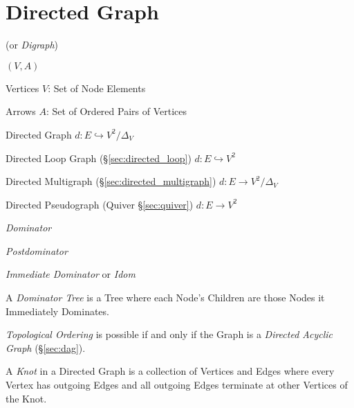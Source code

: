 \section{Directed Graph}\label{sec:directed_graph}

(or \emph{Digraph})

$(V,A)$

Vertices $V$: Set of Node Elements

Arrows $A$: Set of Ordered Pairs of Vertices

Directed Graph
$d : E \hookrightarrow V^2 / \Delta_V$

Directed Loop Graph (\S\ref{sec:directed_loop}) $d : E \hookrightarrow
V^2$

Directed Multigraph (\S\ref{sec:directed_multigraph}) $d : E
\rightarrow V^2 / \Delta_V$

Directed Pseudograph (Quiver \S\ref{sec:quiver}) $d : E \rightarrow
V^2$



\emph{Dominator}

\emph{Postdominator}

\emph{Immediate Dominator} or \emph{Idom}

A \emph{Dominator Tree} is a Tree where each Node's Children are those
Nodes it Immediately Dominates.

\emph{Topological Ordering} is possible if and only if the Graph is a
\emph{Directed Acyclic Graph} (\S\ref{sec:dag}).

A \emph{Knot} in a Directed Graph is a collection of Vertices and
Edges where every Vertex has outgoing Edges and all outgoing Edges
terminate at other Vertices of the Knot.

